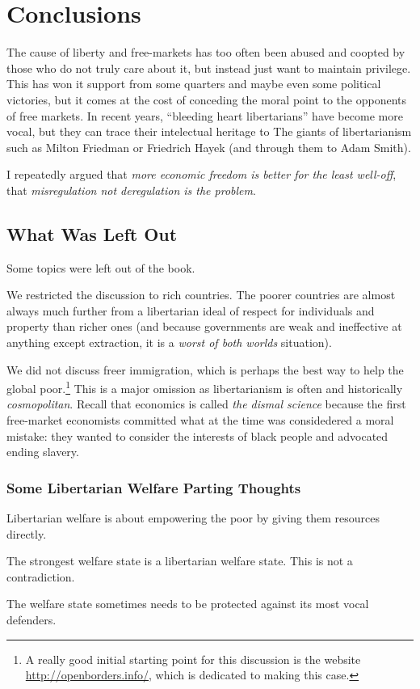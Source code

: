 \chapter{Conclusions}

The cause of liberty and free-markets has too often been abused and coopted by
those who do not truly care about it, but instead just want to maintain
privilege. This has won it support from some quarters and maybe even some
political victories, but it comes at the cost of conceding the moral point to
the opponents of free markets. In recent years, ``bleeding heart libertarians''
have become more vocal, but they can trace their intelectual heritage to The
giants of libertarianism such as Milton Friedman or Friedrich Hayek (and
through them to Adam Smith).

I repeatedly argued that \emph{more economic freedom is better for the least
well-off}, that \emph{misregulation not deregulation is the problem}.

\section{What Was Left Out}

Some topics were left out of the book.

We restricted the discussion to rich countries. The poorer countries are almost
always much further from a libertarian ideal of respect for individuals and
property than richer ones (and because governments are weak and ineffective at
anything except extraction, it is a \emph{worst of both worlds} situation).

We did not discuss freer immigration, which is perhaps the best way to help the
global poor.\footnote{A really good initial starting point for this discussion
is the website \url{http://openborders.info/}, which is dedicated to making
this case.} This is a major omission as libertarianism is often and
historically \emph{cosmopolitan}. Recall that economics is called \emph{the
dismal science} because the first free-market economists committed what at the
time was considedered a moral mistake: they wanted to consider the interests of
black people and advocated ending slavery.

\subsection{Some Libertarian Welfare Parting Thoughts}

\thought Libertarian welfare is about empowering the poor by giving them
resources directly.

\thought The strongest welfare state is a libertarian welfare state. This is
not a contradiction.

\thought The welfare state sometimes needs to be protected against its most
vocal defenders.

